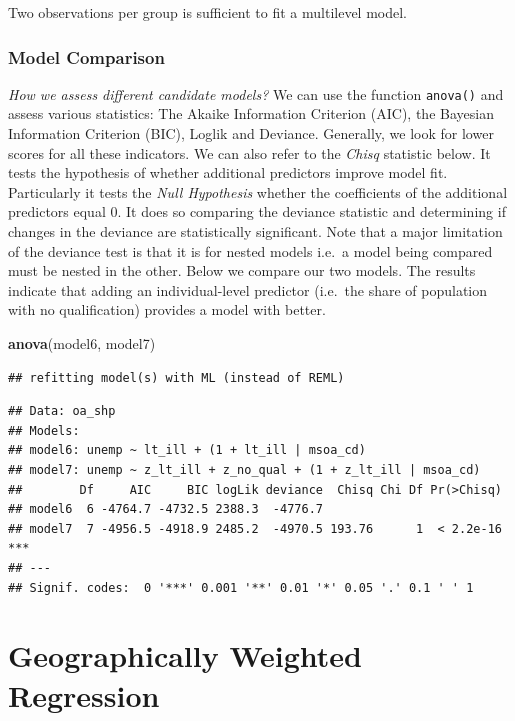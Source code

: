 \documentclass[]{book}
\newenvironment{Shaded}{\begin{snugshade}}{\end{snugshade}}
\newcommand{\KeywordTok}[1]{\textcolor[rgb]{0.13,0.29,0.53}{\textbf{#1}}}
\newcommand{\NormalTok}[1]{#1}
\begin{document}
Two observations per group is sufficient to fit a multilevel model.

\subsection{Model Comparison}\label{model-comparison}

\emph{How we assess different candidate models?} We can use the function
\texttt{anova()} and assess various statistics: The Akaike Information
Criterion (AIC), the Bayesian Information Criterion (BIC), Loglik and
Deviance. Generally, we look for lower scores for all these indicators.
We can also refer to the \emph{Chisq} statistic below. It tests the
hypothesis of whether additional predictors improve model fit.
Particularly it tests the \emph{Null Hypothesis} whether the
coefficients of the additional predictors equal 0. It does so comparing
the deviance statistic and determining if changes in the deviance are
statistically significant. Note that a major limitation of the deviance
test is that it is for nested models i.e.~a model being compared must be
nested in the other. Below we compare our two models. The results
indicate that adding an individual-level predictor (i.e.~the share of
population with no qualification) provides a model with better.

\begin{Shaded}
\begin{Highlighting}[]
\KeywordTok{anova}\NormalTok{(model6, model7)}
\end{Highlighting}
\end{Shaded}

\begin{verbatim}
## refitting model(s) with ML (instead of REML)
\end{verbatim}

\begin{verbatim}
## Data: oa_shp
## Models:
## model6: unemp ~ lt_ill + (1 + lt_ill | msoa_cd)
## model7: unemp ~ z_lt_ill + z_no_qual + (1 + z_lt_ill | msoa_cd)
##        Df     AIC     BIC logLik deviance  Chisq Chi Df Pr(>Chisq)    
## model6  6 -4764.7 -4732.5 2388.3  -4776.7                             
## model7  7 -4956.5 -4918.9 2485.2  -4970.5 193.76      1  < 2.2e-16 ***
## ---
## Signif. codes:  0 '***' 0.001 '**' 0.01 '*' 0.05 '.' 0.1 ' ' 1
\end{verbatim}

\chapter{Geographically Weighted
Regression}\label{geographically-weighted-regression}
\end{document}
